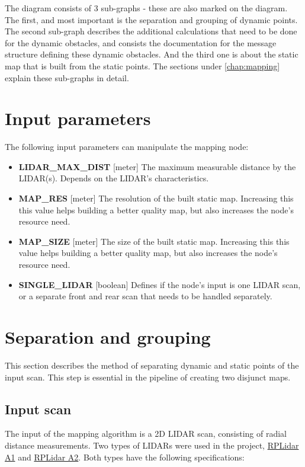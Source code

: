 The diagram consists of 3 sub-graphs - these are also marked on the diagram. The first, and most important is the separation and grouping of dynamic points. The second sub-graph describes the additional calculations that need to be done for the dynamic obstacles, and consists the documentation for the message structure defining these dynamic obstacles. And the third one is about the static map that is built from the static points. The sections under \ref{chap:mapping} explain these sub-graphs in detail.

\begin{minipage}{\textwidth}
\section{Input parameters}
\label{chap:input_parameters}
The following input parameters can manipulate the mapping node:

\begin{itemize}
\item\textbf{LIDAR\_MAX\_DIST} [meter] The maximum measurable distance by the LIDAR(s). Depends on the LIDAR's characteristics.
\item\textbf{MAP\_RES} [meter] The resolution of the built static map. Increasing this this value helps building a better quality map, but also increases the node's resource need.
\item\textbf{MAP\_SIZE} [meter] The size of the built static map. Increasing this this value helps building a better quality map, but also increases the node's resource need.
\item \textbf{SINGLE\_LIDAR} [boolean] Defines if the node's input is one LIDAR scan, or a separate front and rear scan that needs to be handled separately.
\end{itemize}
\end{minipage}

\section{Separation and grouping}
\label{chap:separation_and_grouping}
This section describes the method of separating dynamic and static points of the input scan. This step is essential in the pipeline of creating two disjunct maps.

\subsection{Input scan}
The input of the mapping algorithm is a 2D LIDAR scan, consisting of radial distance measurements. Two types of LIDARs were used in the project, \href{http://www.slamtec.com/en/lidar/a1}{RPLidar A1} and \href{http://www.slamtec.com/en/lidar/a2}{RPLidar A2}.
Both types have the following specifications:

